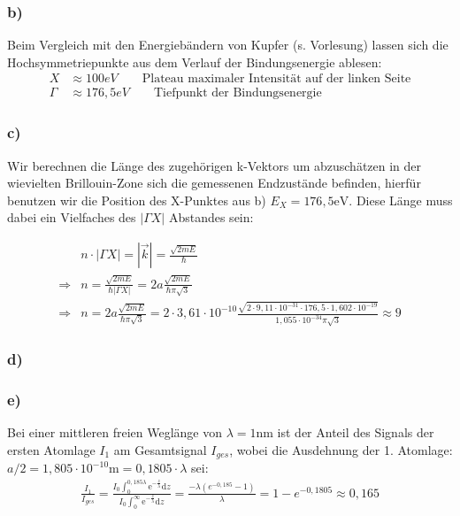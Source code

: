 \subsubsection*{b)}
Beim Vergleich mit den Energiebändern von Kupfer (s. Vorlesung) lassen sich die Hochsymmetriepunkte aus dem Verlauf der Bindungsenergie ablesen:
\begin{align*}
X &\approx 100 \unit{eV}\qquad\text{Plateau maximaler  Intensität auf der linken Seite}\\
\Gamma &\approx 176{,}5\unit{eV} \qquad\text{Tiefpunkt der Bindungsenergie}
\end{align*}
\subsubsection*{c)}
Wir berechnen die Länge des zugehörigen k-Vektors um abzuschätzen in der wievielten
Brillouin-Zone sich die gemessenen Endzustände befinden, hierfür benutzen wir die
Position des X-Punktes aus b) $E_X = 176,5 \mathrm{eV}$. Diese Länge muss dabei ein
Vielfaches des $|\Gamma X|$ Abstandes sein:


\begin{align*}
&n\cdot |\Gamma X| = |\vec{k}| = \frac{\sqrt{2mE}}{\hbar}\\
\Rightarrow & n = \frac{\sqrt{2mE}}{\hbar|\Gamma X|} = 2a\frac{\sqrt{2mE}}{\hbar\pi\sqrt{3}}\\
\Rightarrow & n =  2a\frac{\sqrt{2mE}}{\hbar\pi\sqrt{3}} = 2\cdot3{,}61\cdot10^{-10}\frac{\sqrt{2\cdot9{,}11\cdot10^{-31}\cdot176{,}5\cdot1{,}602\cdot10^{-19}}}{1{,}055\cdot10^{-34}\pi\sqrt{3}} \approx 9
\end{align*}
\subsubsection*{d)}

\subsubsection*{e)}
Bei einer mittleren freien Weglänge von $\lambda = 1\mathrm{nm}$ ist der Anteil des Signals der ersten Atomlage $I_1$ am Gesamtsignal $I_{ges}$, wobei die Ausdehnung der 1. Atomlage: $a/2 = 1{,}805\cdot10^{-10} \mathrm{m} = 0{,}1805\cdot \lambda$ sei:
\begin{align*}
\frac{I_1}{I_{ges}} = \frac{I_0\int_0^{0{,}185\lambda}\mathrm{e}^{-\frac{z}{\lambda}}\mathrm{d}z}{I_0\int_0^{\infty}\mathrm{e}^{-\frac{z}{\lambda}}\mathrm{d}z} = \frac{-\lambda(e^{-0{,}185}-1)}{\lambda} = 1-e^{-0{,}1805} \approx 0{,}165
\end{align*}
